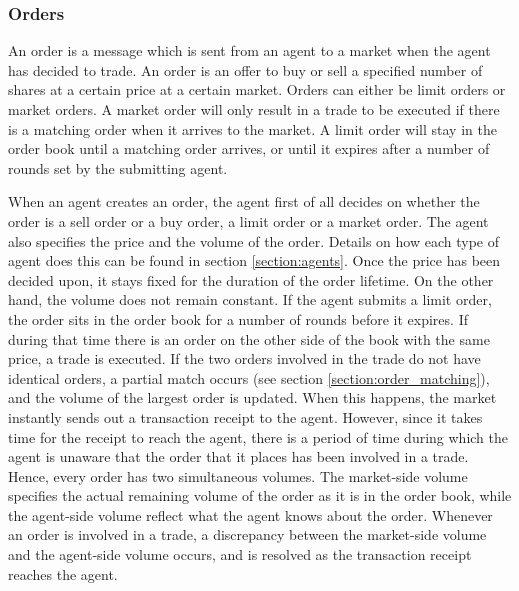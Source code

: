 \subsubsection{Orders}
An order is a message which is sent from an agent to a market when the agent has decided to trade. An order is an offer to buy or sell a specified number of shares at a certain price at a certain market. Orders can either be limit orders or market orders. A market order will only result in a trade to be executed if there is a matching order when it arrives to the market. A limit order will stay in the order book until a matching order arrives, or until it expires after a number of rounds set by the submitting agent. 

When an agent creates an order, the agent first of all decides on whether the order is a sell order or a buy order, a limit order or a market order. The agent also specifies the price and the volume of the order. Details on how each type of agent does this can be found in section \ref{section:agents}. Once the price has been decided upon, it stays fixed for the duration of the order lifetime. On the other hand, the volume does not remain constant. If the agent submits a limit order, the order sits in the order book for a number of rounds before it expires. If during that time there is an order on the other side of the book with the same price, a trade is executed. If the two orders involved in the trade do not have identical orders, a partial match occurs (see section \ref{section:order_matching}), and the volume of the largest order is updated. When this happens, the market instantly sends out a transaction receipt to the agent. However, since it takes time for the receipt to reach the agent, there is a period of time during which the agent is unaware that the order that it places has been involved in a trade. Hence, every order has two simultaneous volumes. The market-side volume specifies the actual remaining volume of the order as it is in the order book, while the agent-side volume reflect what the agent knows about the order. Whenever an order is involved in a trade, a discrepancy between the market-side volume and the agent-side volume occurs, and is resolved as the transaction receipt reaches the agent. 


